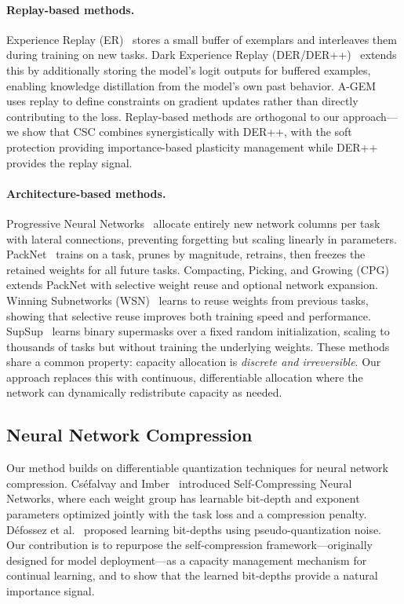 \documentclass[11pt]{article}
\begin{document}
\paragraph{Replay-based methods.}
Experience Replay (ER)~\citep{chaudhry2019tiny} stores a small buffer of exemplars and interleaves them during training on new tasks.
Dark Experience Replay (DER/DER++)~\citep{buzzega2020dark} extends this by additionally storing the model's logit outputs for buffered examples, enabling knowledge distillation from the model's own past behavior.
A-GEM~\citep{chaudhry2018efficient} uses replay to define constraints on gradient updates rather than directly contributing to the loss.
Replay-based methods are orthogonal to our approach---we show that CSC combines synergistically with DER++, with the soft protection providing importance-based plasticity management while DER++ provides the replay signal.

\paragraph{Architecture-based methods.}
Progressive Neural Networks~\citep{rusu2016progressive} allocate entirely new network columns per task with lateral connections, preventing forgetting but scaling linearly in parameters.
PackNet~\citep{mallya2018packnet} trains on a task, prunes by magnitude, retrains, then freezes the retained weights for all future tasks.
Compacting, Picking, and Growing (CPG)~\citep{hung2019compacting} extends PackNet with selective weight reuse and optional network expansion.
Winning Subnetworks (WSN)~\citep{kang2022winning} learns to reuse weights from previous tasks, showing that selective reuse improves both training speed and performance.
SupSup~\citep{wortsman2020supermasks} learns binary supermasks over a fixed random initialization, scaling to thousands of tasks but without training the underlying weights.
These methods share a common property: capacity allocation is \textit{discrete and irreversible}.
Our approach replaces this with continuous, differentiable allocation where the network can dynamically redistribute capacity as needed.

\subsection{Neural Network Compression}

Our method builds on differentiable quantization techniques for neural network compression.
Cséfalvay and Imber~\citep{csefalvay2023self} introduced Self-Compressing Neural Networks, where each weight group has learnable bit-depth and exponent parameters optimized jointly with the task loss and a compression penalty.
Défossez et al.~\citep{defossez2022differentiable} proposed learning bit-depths using pseudo-quantization noise.
Our contribution is to repurpose the self-compression framework---originally designed for model deployment---as a capacity management mechanism for continual learning, and to show that the learned bit-depths provide a natural importance signal.
\end{document}

